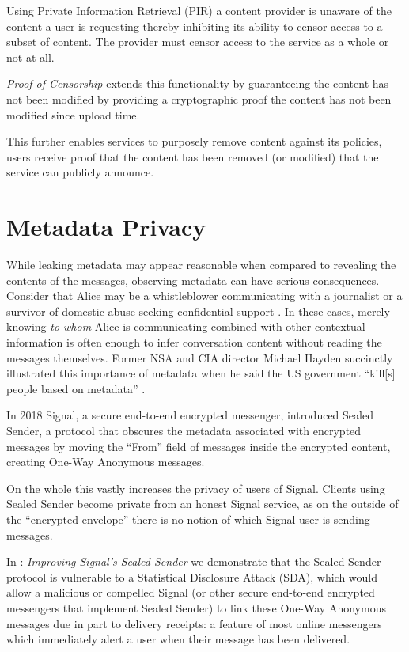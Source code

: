 Using Private Information Retrieval (PIR) a content provider is unaware of the
content a user is requesting thereby inhibiting its ability to censor access to
a subset of content. The provider must censor access to the service as a whole
or not at all.

\emph{Proof of Censorship} extends this functionality by guaranteeing the
content has not been modified by providing a cryptographic proof the content has
not been modified since upload time.

This further enables services to purposely remove content against its policies,
users receive proof that the content has been removed (or modified) that the
service can publicly announce.

\section{Metadata Privacy}
While leaking metadata may appear reasonable when compared to revealing the
contents of the messages, observing metadata can have serious consequences.
Consider that Alice may be a whistleblower communicating with a journalist
\cite{190976} or a survivor of domestic abuse seeking confidential support
\cite{236244}. In these cases, merely knowing \emph{to whom} Alice is
communicating combined with other contextual information is often enough to
infer conversation content without reading the messages themselves. Former NSA
and CIA director Michael Hayden succinctly illustrated this importance of
metadata when he said the US government ``kill[s] people based on metadata''
\cite{haydenmetadata}.

In 2018 Signal, a secure end-to-end encrypted messenger, introduced Sealed
Sender\cite{sealed-sender}, a protocol that obscures the metadata associated
with encrypted messages by moving the ``From'' field of messages inside the
encrypted content, creating One-Way Anonymous messages.

On the whole this vastly increases the privacy of users of Signal. Clients using
Sealed Sender become private from an honest Signal service, as on the outside of
the ``encrypted envelope'' there is no notion of which Signal user is sending
messages.

In : \emph{Improving Signal's Sealed Sender} we demonstrate that
the Sealed Sender protocol is vulnerable to a Statistical Disclosure Attack
(SDA), which would allow a malicious or compelled Signal (or other secure
end-to-end encrypted messengers that implement Sealed Sender) to link these
One-Way Anonymous messages due in part to delivery receipts: a feature of most
online messengers which immediately alert a user when their message has been
delivered.

